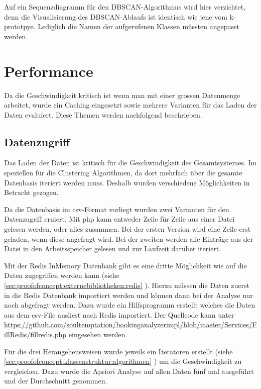 Auf ein Sequenzdiagramm für den DBSCAN-Algorithmus wird hier verzichtet, denn die Visualisierung des DBSCAN-Ablaufs ist identisch wie jene vom k-prototpye. Lediglich die Namen der aufgerufenen Klassen müssten angepasst werden.


\section{Performance}
\label{sec:proofofconcept:performance}
Da die Geschwindigkeit kritisch ist wenn man mit einer grossen Datenmenge arbeitet, wurde ein Caching eingesetzt sowie mehrere Varianten für das Laden der Daten evaluiert. Diese Themen werden nachfolgend beschrieben.

\subsection{Datenzugriff}
\label{sec:proofofconcept:performance:datenzugriff}
Das Laden der Daten ist kritisch für die Geschwindigkeit des Gesamtsystemes. Im speziellen für die Clustering Algorithmen, da dort mehrfach über die gesamte Datenbasis iteriert werden muss. Deshalb wurden verschiedene Möglichkeiten in Betracht gezogen.

Da die Datenbasis im \gls{csv}-Format vorliegt wurden zwei Varianten für den Datenzugriff eruiert. Mit \gls{php} kann entweder Zeile für Zeile aus einer Datei gelesen werden, oder alles zusammen.  Bei der ersten Version wird eine Zeile erst geladen, wenn diese angefragt wird. Bei der zweiten werden alle Einträge aus der Datei in den Arbeitsspeicher gelesen und zur Laufzeit darüber iteriert.

Mit der Redis InMemory Datenbank gibt es eine dritte Möglichkeit wie auf die Daten zugegriffen werden kann (siehe \cref{sec:proofofconcept:externebibliotheken:redis} ). Hierzu müssen die Daten zuerst in die Redis Datenbank importiert werden und können dann bei der Analyse nur noch abgefragt werden. Dazu wurde ein Hilfsprogramm erstellt welches die Daten aus dem \gls{csv}-File ausliest nach Redis importiert. Der Quellcode kann unter \url{https://github.com/soultemptation/bookinganalyzerimpl/blob/master/Services/FillRedis/fillredis.php} eingesehen werden.

Für die drei Herangehensweisen wurde jeweils ein Iteratoren erstellt (siehe \cref{sec:proofofconcept:klassenstruktur:algorithmen} ) um die Geschwindigkeit zu vergleichen. Dazu wurde die Apriori Analyse auf allen Daten fünf mal ausgeführt und der Durchschnitt genommen.

